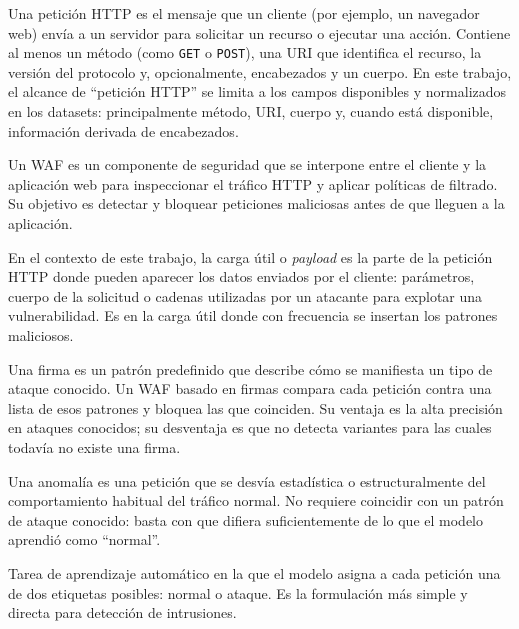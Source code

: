 \documentclass[12pt,oneside]{report}
\begin{document}
\begin{description}[leftmargin=0pt, labelindent=0pt]

  \item[\textbf{Petición HTTP (\textit{request}).}]
  Una petición HTTP es el mensaje que un cliente (por ejemplo, un navegador web) envía a un servidor para solicitar un recurso o ejecutar una acción. Contiene al menos un método (como \texttt{GET} o \texttt{POST}), una URI que identifica el recurso, la versión del protocolo y, opcionalmente, encabezados y un cuerpo. En este trabajo, el alcance de ``petición HTTP'' se limita a los campos disponibles y normalizados en los datasets: principalmente método, URI, cuerpo y, cuando está disponible, información derivada de encabezados.

  \item[\textbf{WAF (\textit{Web Application Firewall}).}]
  Un WAF es un componente de seguridad que se interpone entre el cliente y la aplicación web para inspeccionar el tráfico HTTP y aplicar políticas de filtrado. Su objetivo es detectar y bloquear peticiones maliciosas antes de que lleguen a la aplicación.

  \item[\textbf{Carga útil (\textit{payload}).}]
  En el contexto de este trabajo, la carga útil o \textit{payload} es la parte de la petición HTTP donde pueden aparecer los datos enviados por el cliente: parámetros, cuerpo de la solicitud o cadenas utilizadas por un atacante para explotar una vulnerabilidad. Es en la carga útil donde con frecuencia se insertan los patrones maliciosos.

  \item[\textbf{Firma o regla.}]
  Una firma es un patrón predefinido que describe cómo se manifiesta un tipo de ataque conocido. Un WAF basado en firmas compara cada petición contra una lista de esos patrones y bloquea las que coinciden. Su ventaja es la alta precisión en ataques conocidos; su desventaja es que no detecta variantes para las cuales todavía no existe una firma.

  \item[\textbf{Anomalía.}]
  Una anomalía es una petición que se desvía estadística o estructuralmente del comportamiento habitual del tráfico normal. No requiere coincidir con un patrón de ataque conocido: basta con que difiera suficientemente de lo que el modelo aprendió como ``normal''.

  \item[\textbf{Clasificación binaria.}]
  Tarea de aprendizaje automático en la que el modelo asigna a cada petición una de dos etiquetas posibles: normal o ataque. Es la formulación más simple y directa para detección de intrusiones.


\end{description}
\end{document}
